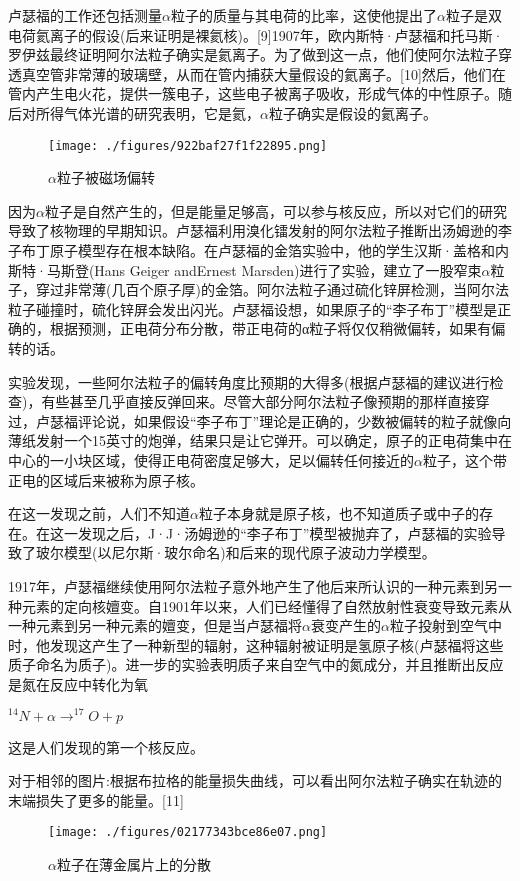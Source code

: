 卢瑟福的工作还包括测量$\alpha$粒子的质量与其电荷的比率，这使他提出了$\alpha$粒子是双电荷氦离子的假设(后来证明是裸氦核)。[9]1907年，欧内斯特·卢瑟福和托马斯·罗伊兹最终证明阿尔法粒子确实是氦离子。为了做到这一点，他们使阿尔法粒子穿透真空管非常薄的玻璃壁，从而在管内捕获大量假设的氦离子。[10]然后，他们在管内产生电火花，提供一簇电子，这些电子被离子吸收，形成气体的中性原子。随后对所得气体光谱的研究表明，它是氦，$\alpha$粒子确实是假设的氦离子。
\begin{figure}[ht]
\centering
\texttt{[image: ./figures/922baf27f1f22895.png]}
\caption{$\alpha$粒子被磁场偏转} \label{fig_ALZ_4}
\end{figure}
因为$\alpha$粒子是自然产生的，但是能量足够高，可以参与核反应，所以对它们的研究导致了核物理的早期知识。卢瑟福利用溴化镭发射的阿尔法粒子推断出汤姆逊的李子布丁原子模型存在根本缺陷。在卢瑟福的金箔实验中，他的学生汉斯·盖格和内斯特·马斯登(Hans Geiger andErnest Marsden)进行了实验，建立了一股窄束$\alpha$粒子，穿过非常薄(几百个原子厚)的金箔。阿尔法粒子通过硫化锌屏检测，当阿尔法粒子碰撞时，硫化锌屏会发出闪光。卢瑟福设想，如果原子的“李子布丁”模型是正确的，根据预测，正电荷分布分散，带正电荷的α粒子将仅仅稍微偏转，如果有偏转的话。

实验发现，一些阿尔法粒子的偏转角度比预期的大得多(根据卢瑟福的建议进行检查)，有些甚至几乎直接反弹回来。尽管大部分阿尔法粒子像预期的那样直接穿过，卢瑟福评论说，如果假设“李子布丁”理论是正确的，少数被偏转的粒子就像向薄纸发射一个15英寸的炮弹，结果只是让它弹开。可以确定，原子的正电荷集中在中心的一小块区域，使得正电荷密度足够大，足以偏转任何接近的$\alpha$粒子，这个带正电的区域后来被称为原子核。

在这一发现之前，人们不知道$\alpha$粒子本身就是原子核，也不知道质子或中子的存在。在这一发现之后，J·J·汤姆逊的“李子布丁”模型被抛弃了，卢瑟福的实验导致了玻尔模型(以尼尔斯·玻尔命名)和后来的现代原子波动力学模型。

1917年，卢瑟福继续使用阿尔法粒子意外地产生了他后来所认识的一种元素到另一种元素的定向核嬗变。自1901年以来，人们已经懂得了自然放射性衰变导致元素从一种元素到另一种元素的嬗变，但是当卢瑟福将$\alpha$衰变产生的$\alpha$粒子投射到空气中时，他发现这产生了一种新型的辐射，这种辐射被证明是氢原子核(卢瑟福将这些质子命名为质子)。进一步的实验表明质子来自空气中的氮成分，并且推断出反应是氮在反应中转化为氧

$^{14}N + \alpha \to ^{17}O + p$

这是人们发现的第一个核反应。

对于相邻的图片:根据布拉格的能量损失曲线，可以看出阿尔法粒子确实在轨迹的末端损失了更多的能量。[11]
\begin{figure}[ht]
\centering
\texttt{[image: ./figures/02177343bce86e07.png]}
\caption{$\alpha$粒子在薄金属片上的分散} \label{fig_ALZ_5}
\end{figure}

